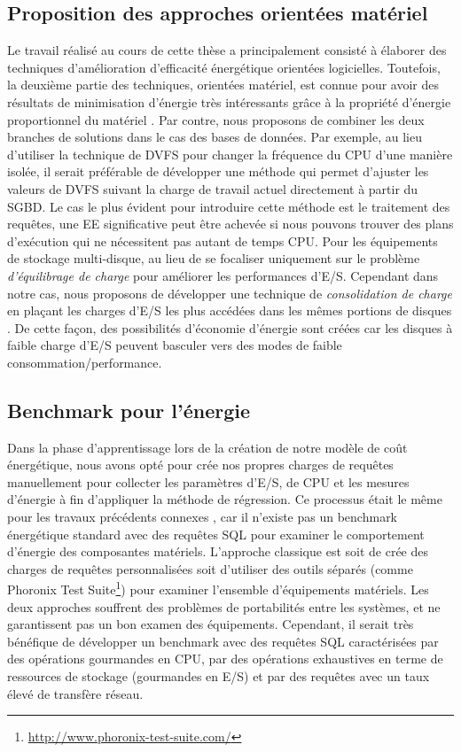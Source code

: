 \subsection{Proposition des approches orientées matériel}
Le travail réalisé au cours de cette thèse a principalement consisté à élaborer des techniques d'amélioration d'efficacité énergétique orientées logicielles. Toutefois, la deuxième partie des techniques, orientées matériel, est connue pour avoir des résultats de minimisation d'énergie très intéressants grâce à la propriété d'énergie proportionnel du matériel \cite{Skadron04}. Par contre, nous proposons de combiner les deux branches de solutions dans le cas des bases de données. Par exemple, au lieu d'utiliser la technique de DVFS pour changer la fréquence du CPU d'une manière isolée, il serait préférable de développer une méthode qui permet d'ajuster les valeurs de DVFS suivant la charge de travail actuel directement à partir du SGBD. Le cas le plus évident pour introduire cette méthode est le traitement des requêtes, une EE significative peut être achevée si nous pouvons trouver des plans d'exécution qui ne nécessitent pas autant de temps CPU. Pour les équipements de stockage multi-disque, au lieu de se focaliser uniquement sur le problème \textit{d'équilibrage de charge} pour améliorer les performances d'E/S. Cependant dans notre cas, nous proposons de développer une technique de \textit{consolidation de charge} en plaçant les charges d'E/S les plus accédées dans les mêmes portions de disques \cite{Srikantaiah08}. De cette façon, des possibilités d'économie d'énergie sont créées car les disques à faible charge d'E/S peuvent basculer vers des modes de faible consommation/performance.
 
\subsection{Benchmark pour l'énergie}
Dans la phase d'apprentissage lors de la création de notre modèle de coût énergétique, nous avons opté pour crée nos propres charges de requêtes manuellement pour collecter les paramètres d'E/S, de CPU et les mesures d'énergie à fin d'appliquer la méthode de régression. Ce processus était le même pour les travaux précédents connexes \cite{Xu13,Kunjir12,Lang11,Rodriguez11}, car il n'existe pas un benchmark énergétique standard avec des requêtes SQL pour examiner le comportement d'énergie des composantes matériels. L'approche classique est soit de crée des charges de requêtes personnalisées soit d'utiliser des outils séparés (comme Phoronix Test Suite\footnote{\url{http://www.phoronix-test-suite.com/}}) pour examiner l'ensemble d'équipements matériels. Les deux approches souffrent des problèmes de portabilités entre les systèmes, et ne garantissent pas un bon examen des équipements. Cependant, il serait très bénéfique de développer un benchmark avec des requêtes SQL caractérisées par des opérations gourmandes en CPU, par des opérations exhaustives en terme de ressources de stockage (gourmandes en E/S) et par des requêtes avec un taux élevé de transfère réseau.
